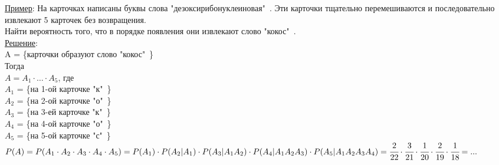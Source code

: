 \underline{Пример}: На карточках написаны буквы слова "дезоксирибонуклеиновая"\ . Эти карточки тщательно перемешиваются и последовательно извлекают 5 карточек без возвращения. \\
Найти вероятность того, что в порядке появления они извлекают слово "кокос"\ . \\
\underline{Решение}: \\
A = \{карточки образуют слово "кокос"\ \} \\
Тогда \\
$A = A_1 \cdot \ldots \cdot A_5$, где \\
$A_1$ = \{на 1-ой карточке "к"\ \} \\
$A_2$ = \{на 2-ой карточке "о"\ \} \\
$A_3$ = \{на 3-ей карточке "к"\ \} \\
$A_4$ = \{на 4-ой карточке "о"\ \} \\
$A_5$ = \{на 5-ой карточке "с"\ \} \\

$P(A) = P(A_1 \cdot A_2 \cdot A_3 \cdot A_4 \cdot A_5) = P(A_1) \cdot P(A_2|A_1) \cdot P(A_3|A_1 A_2) \cdot P(A_4|A_1 A_2 A_3) \cdot P(A_5|A_1 A_2 A_3 A_4) = \cfrac{2}{22} \cdot \cfrac{3}{21} \cdot \cfrac{1}{20} \cdot \cfrac{2}{19} \cdot \cfrac{1}{18} = ...$ \\


